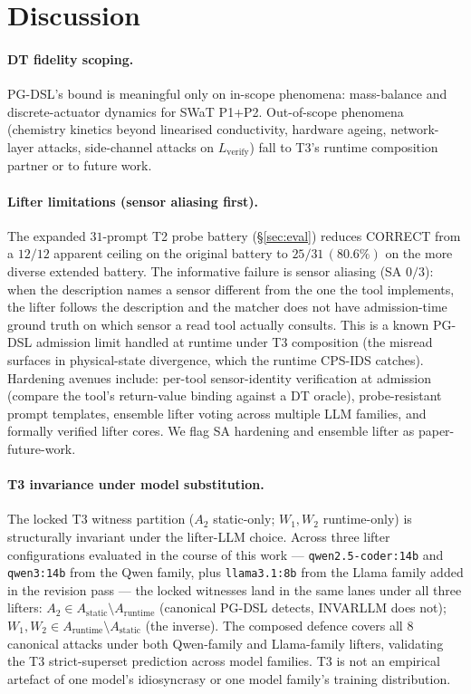 \section{Discussion}
\label{sec:disc}

\paragraph{DT fidelity scoping.}
PG-DSL's bound is meaningful only on in-scope phenomena: mass-balance
and discrete-actuator dynamics for SWaT P1+P2. Out-of-scope phenomena
(chemistry kinetics beyond linearised conductivity, hardware
ageing, network-layer attacks, side-channel attacks on
$L_{\text{verify}}$) fall to T3's runtime composition partner or to
future work.

\paragraph{Lifter limitations (sensor aliasing first).}
The expanded $31$-prompt T2 probe battery (\S\ref{sec:eval}) reduces
CORRECT from a $12/12$ apparent ceiling on the original battery to
$25/31\,(80.6\%)$ on the more diverse extended battery. The
informative failure is sensor aliasing (SA $0/3$): when the
description names a sensor different from the one the tool
implements, the lifter follows the description and the matcher does
not have admission-time ground truth on which sensor a read tool
actually consults. This is a known PG-DSL admission limit handled
at runtime under T3 composition (the misread surfaces in
physical-state divergence, which the runtime CPS-IDS catches).
Hardening avenues include: per-tool sensor-identity verification at
admission (compare the tool's return-value binding against a DT
oracle), probe-resistant prompt templates, ensemble lifter voting
across multiple LLM families, and formally verified lifter cores.
We flag SA hardening and ensemble lifter as paper-future-work.

\paragraph{T3 invariance under model substitution.}
The locked T3 witness partition ($A_2$ static-only; $W_1, W_2$
runtime-only) is structurally invariant under the lifter-LLM choice.
Across three lifter configurations evaluated in the course of this
work --- \texttt{qwen2.5-coder:14b} and \texttt{qwen3:14b} from the
Qwen family, plus \texttt{llama3.1:8b} from the Llama family added in
the revision pass --- the locked witnesses land in the same lanes
under all three lifters: $A_2 \in A_{\text{static}} \setminus
A_{\text{runtime}}$ (canonical PG-DSL detects, INVARLLM does not);
$W_1, W_2 \in A_{\text{runtime}} \setminus A_{\text{static}}$ (the
inverse). The composed defence covers all $8$ canonical attacks under
both Qwen-family and Llama-family lifters, validating the T3
strict-superset prediction across model families. T3 is not an
empirical artefact of one model's idiosyncrasy or one model family's
training distribution.

